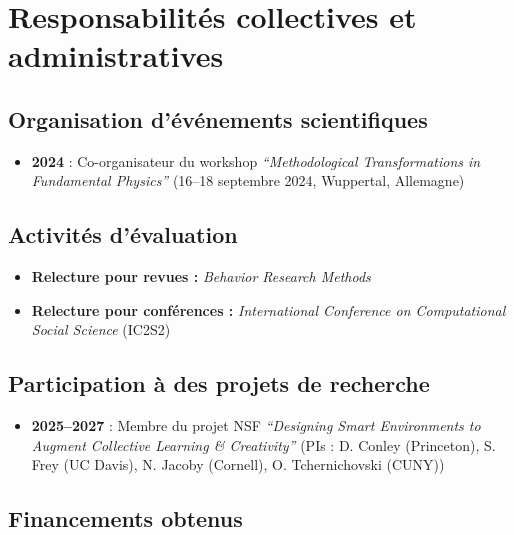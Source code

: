 \documentclass[11pt,a4paper]{article}
\begin{document}

\section{Responsabilités collectives et administratives}

\subsection{Organisation d'événements scientifiques}

\begin{itemize}
    \item \textbf{2024} : Co-organisateur du workshop \textit{``Methodological Transformations in Fundamental Physics''} (16--18 septembre 2024, Wuppertal, Allemagne)
\end{itemize}

\subsection{Activités d'évaluation}

\begin{itemize}
    \item \textbf{Relecture pour revues :} \textit{Behavior Research Methods}
    \item \textbf{Relecture pour conférences :} \textit{International Conference on Computational Social Science} (IC2S2)
\end{itemize}

\subsection{Participation à des projets de recherche}

\begin{itemize}
    \item \textbf{2025--2027} : Membre du projet NSF \textit{``Designing Smart Environments to Augment Collective Learning \& Creativity''} (PIs : D. Conley (Princeton), S. Frey (UC Davis), N. Jacoby (Cornell), O. Tchernichovski (CUNY))
\end{itemize}

\subsection{Financements obtenus}
\end{document}
